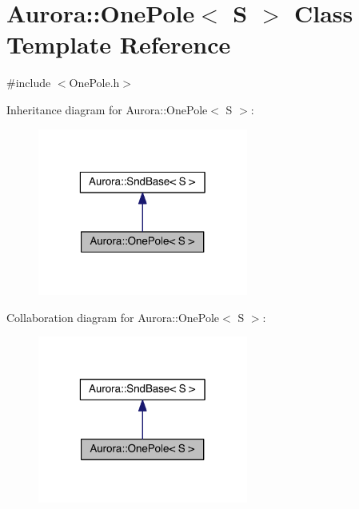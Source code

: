 \hypertarget{class_aurora_1_1_one_pole}{}\section{Aurora\+:\+:One\+Pole$<$ S $>$ Class Template Reference}
\label{class_aurora_1_1_one_pole}


{\ttfamily \#include $<$One\+Pole.\+h$>$}



Inheritance diagram for Aurora\+:\+:One\+Pole$<$ S $>$\+:\nopagebreak
\begin{figure}[H]
\begin{center}
\leavevmode
\includegraphics[width=196pt]{class_aurora_1_1_one_pole__inherit__graph}
\end{center}
\end{figure}


Collaboration diagram for Aurora\+:\+:One\+Pole$<$ S $>$\+:\nopagebreak
\begin{figure}[H]
\begin{center}
\leavevmode
\includegraphics[width=196pt]{class_aurora_1_1_one_pole__coll__graph}
\end{center}
\end{figure}
